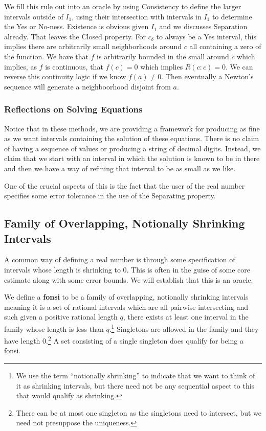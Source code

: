 \documentclass[12pt]{article}
\begin{document}
We fill this rule out into an oracle by using Consistency to define the larger intervals outside of $I_1$, using their intersection with intervals in $I_1$ to determine the Yes or No-ness. Existence is obvious given $I_1$ and we discusses Separation already. That leaves the Closed property. For $c_\delta$ to always be a Yes interval, this implies there are arbitrarily small neighborhoods around $c$ all containing a zero of the function. We have that $f$ is arbitrarily bounded in the small around $c$ which implies, as $f$ is continuous, that $f(c) = 0$ which implies $R(c:c)=0$. We can reverse this continuity logic if we know $f(a) \neq 0$. Then eventually a Newton's sequence will generate a neighboorhood disjoint from $a$. 



\subsubsection{Reflections on Solving Equations}

Notice that in these methods, we are providing a framework for producing as fine as we want intervals containing the solution of these equations. There is no claim of having a sequence of values or producing a string of decimal digits. Instead, we claim that we start with an interval in which the solution is known to be in there and then we have a way of refining that interval to be as small as we like. 

One of the crucial aspects of this is the fact that the user of the real number specifies some error tolerance in the use of the Separating property. 

\subsection{Family of Overlapping, Notionally Shrinking Intervals} \label{sec:ni}

A common way of defining a real number is through some specification of intervals whose length is shrinking to 0. This is often in the guise of some core estimate along with some error bounds. We will establish that this is an oracle. 


We define a \textbf{fonsi} to be a family of overlapping, notionally shrinking intervals meaning it is a set of rational intervals which are all pairwise intersecting and such given a positive rational length $q$, there exists at least one interval in the family whose length is less than $q$.\footnote{We use the term ``notionally shrinking'' to indicate that we want to think of it as shrinking intervals, but there need not be any sequential aspect to this that would qualify as shrinking.} Singletons are allowed in the family and they have length 0.\footnote{There can be at most one singleton as the singletons need to intersect, but we need not presuppose the uniqueness.} A set consisting of a single singleton does qualify for being a fonsi.
\end{document}
